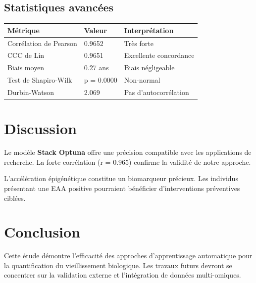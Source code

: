 \documentclass[11pt,a4paper]{article}
\begin{document}
\subsection{Statistiques avancées}
\begin{table}[H]
\centering
\begin{tabular}{lll}
\toprule
\textbf{Métrique} & \textbf{Valeur} & \textbf{Interprétation} \\
\midrule
Corrélation de Pearson & 0.9652 & Très forte \\
CCC de Lin & 0.9651 & Excellente concordance \\
Biais moyen & 0.27 ans & Biais négligeable \\
Test de Shapiro-Wilk & p = 0.0000 & Non-normal \\
Durbin-Watson & 2.069 & Pas d'autocorrélation \\
\bottomrule
\end{tabular}
\end{table}

\section{Discussion}
Le modèle \textbf{Stack Optuna} offre une précision compatible avec les applications de recherche. La forte corrélation (r = 0.965) confirme la validité de notre approche.

L'accélération épigénétique constitue un biomarqueur précieux. Les individus présentant une EAA positive pourraient bénéficier d'interventions préventives ciblées.

\section{Conclusion}
Cette étude démontre l'efficacité des approches d'apprentissage automatique pour la quantification du vieillissement biologique. Les travaux futurs devront se concentrer sur la validation externe et l'intégration de données multi-omiques.
\end{document}
